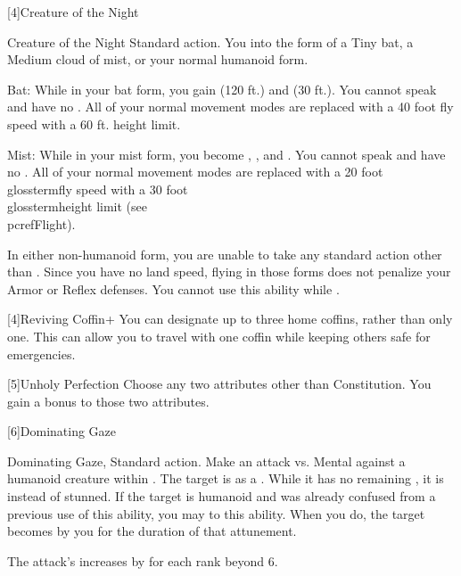         [4]{Creature of the Night}
        \begin{magicalattuneability}{Creature of the Night}{}
            \abilityusagetime Standard action.
            \rankline
            You  into the form of a Tiny bat, a Medium cloud of mist, or your normal humanoid form.
            \begin{raggeditemize}
                \item Bat: While in your bat form, you gain  (120 ft.) and  (30 ft.).
                    You cannot speak and have no .
                    All of your normal movement modes are replaced with a 40 foot fly speed with a 60 ft. height limit.
                \item Mist: While in your mist form, you become , , and .
                    You cannot speak and have no .
                    All of your normal movement modes are replaced with a 20 foot \\glossterm{fly speed} with a 30 foot \\glossterm{height limit} (see \\pcref{Flight}).
            \end{raggeditemize}

            In either non-humanoid form, you are unable to take any standard action other than .
            Since you have no land speed, flying in those forms does not penalize your Armor or Reflex defenses.
            You cannot use this ability while \paralyzed.
        \end{magicalattuneability}

        [4]{Reviving Coffin+} You can designate up to three home coffins, rather than only one.
        This can allow you to travel with one coffin while keeping others safe for emergencies.

        [5]{Unholy Perfection} Choose any two attributes other than Constitution.
        You gain a  bonus to those two attributes.

        [6]{Dominating Gaze}
        \begin{magicalactiveability}{Dominating Gaze}{, }
            \abilityusagetime Standard action.
            \rankline
            Make an attack vs. Mental against a humanoid creature within \shortrange.
            \hit The target is \stunned as a .
            While it has no remaining , it is \confused instead of stunned.
            \crit If the target is humanoid and was already confused from a previous use of this ability, you may  to this ability.
            When you do, the target becomes \dominated by you for the duration of that attunement.

            \rankline
            The attack's  increases by  for each rank beyond 6.
        \end{magicalactiveability}

